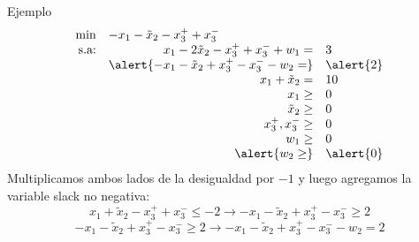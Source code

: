 \documentclass[10pt, aspectratio=169]{beamer}
\begin{document}
    \begin{frame}{Ejemplo}
        \[\begin{array}{rrl}
              \min & \multicolumn{2}{l}{-x_1 - \tilde{x}_2 - x_3^++x_3^-} \\
              \text{s.a:} & x_1 - 2\tilde{x}_2 - x_3^++x_3^-+w_1 =           & 3         \\
              & \alert{-x_1 - \tilde{x}_2 + x_3^+-x_3^- - w_2 =} & \alert{2} \\
              & x_1 + \tilde{x}_2 =                              & 10        \\
              & x_1\geq                                          & 0         \\
              & \tilde{x}_2 \geq                                 & 0         \\
              & x_3^+ ,x_3^- \geq                                & 0         \\
              & w_1\geq                                          & 0         \\
              & \alert{w_2\geq}                                  & \alert{0} \\

        \end{array}
        \]
        Multiplicamos ambos lados de la desigualdad por $-1$ y luego agregamos la variable slack no negativa:
        \[ x_1 + \tilde{x}_2 - x_3^++x_3^- \leq -2 \rightarrow -x_1 - \tilde{x}_2 + x_3^+-x_3^- \geq 2\]
        \[ -x_1 - \tilde{x}_2 + x_3^+-x_3^- \geq 2 \rightarrow -x_1 - \tilde{x}_2 + x_3^+-x_3^- - w_2 = 2 \]
    \end{frame}
\end{document}
